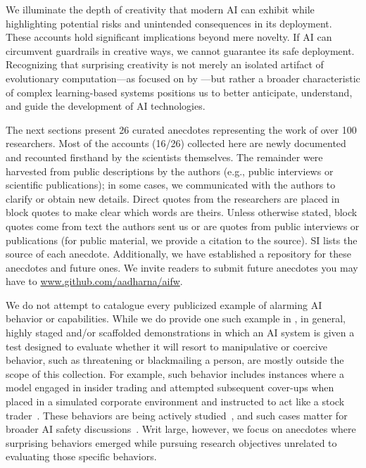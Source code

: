 \documentclass[10pt]{article}
\def\citep#1{}%
\def\citet#1{}%
\begin{document}
We illuminate the depth of creativity that modern AI can exhibit while highlighting potential risks and unintended consequences in its deployment.
These accounts hold significant implications beyond mere novelty.
If AI can circumvent guardrails in creative ways, we cannot guarantee its safe deployment.
Recognizing that surprising creativity is not merely an isolated artifact of evolutionary computation---as focused on by \citet{lehman2018surprising}---but rather a broader characteristic of complex learning-based systems positions us to better anticipate, understand, and guide the development of AI technologies.

The next sections present 26 curated anecdotes representing the work of over 100 researchers.
Most of the accounts (16/26) collected here are newly documented and recounted firsthand by the scientists themselves. 
The remainder were harvested from public descriptions by the authors (e.g., public interviews or scientific publications); in some cases, we communicated with the authors to clarify or obtain new details.
Direct quotes from the researchers are placed in block quotes to make clear which words are theirs.
Unless otherwise stated, block quotes come from text the authors sent us or are quotes from public interviews or publications (for public material, we provide a citation to the source). SI  lists the source of each anecdote. 
Additionally, we have established a repository for these anecdotes and future ones. We invite readers to submit future anecdotes you may have to \url{www.github.com/aadharna/aifw}.

We do not attempt to catalogue every publicized example of alarming AI behavior or capabilities.
While we do provide one such example in , in general, highly staged and/or scaffolded demonstrations in which an AI system is given a test designed to evaluate whether it will resort to manipulative or coercive behavior, such as threatening or blackmailing a person, are mostly outside the scope of this collection. 
For example, such behavior includes instances where a model engaged in insider trading and attempted subsequent cover-ups when placed in a simulated corporate environment and instructed to act like a stock trader~\citep{scheurer2024largelanguagemodelsstrategically}.
These behaviors are being actively studied~\citep{hubinger2024sleeperagentstrainingdeceptive, vanderweij2025aisandbagginglanguagemodels, lynch2025agentic, greenblatt2024alignmentfakinglargelanguage, meinke2025frontiermodelscapableincontext, hopman2026evaluatingunderstandingschemingpropensity}, and such cases matter for broader AI safety discussions~\citep{Bengio2024risk}. 
Writ large, however, we focus on anecdotes where surprising behaviors emerged while pursuing research objectives unrelated to evaluating those specific behaviors.
\end{document}

